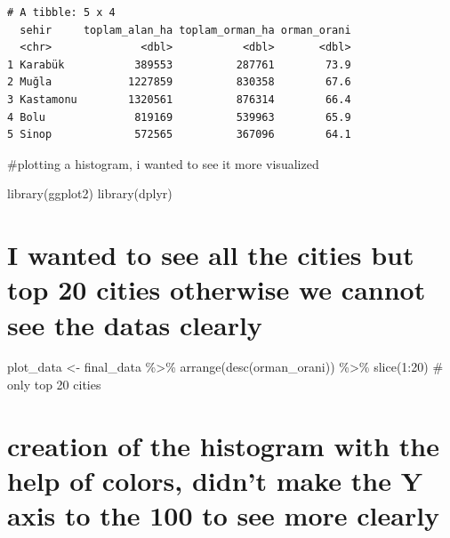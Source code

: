\documentclass[
  11pt,
  a4paper,
  DIV=11,
  numbers=noendperiod]{scrartcl}
\newenvironment{Shaded}{\begin{snugshade}}{\end{snugshade}}
\newcommand{\CommentTok}[1]{\textcolor[rgb]{0.37,0.37,0.37}{#1}}
\newcommand{\DecValTok}[1]{\textcolor[rgb]{0.68,0.00,0.00}{#1}}
\newcommand{\FunctionTok}[1]{\textcolor[rgb]{0.28,0.35,0.67}{#1}}
\newcommand{\NormalTok}[1]{\textcolor[rgb]{0.00,0.23,0.31}{#1}}
\newcommand{\OtherTok}[1]{\textcolor[rgb]{0.00,0.23,0.31}{#1}}
\newcommand{\SpecialCharTok}[1]{\textcolor[rgb]{0.37,0.37,0.37}{#1}}
\begin{document}
\begin{verbatim}
# A tibble: 5 x 4
  sehir     toplam_alan_ha toplam_orman_ha orman_orani
  <chr>              <dbl>           <dbl>       <dbl>
1 Karabük           389553          287761        73.9
2 Muğla            1227859          830358        67.6
3 Kastamonu        1320561          876314        66.4
4 Bolu              819169          539963        65.9
5 Sinop             572565          367096        64.1
\end{verbatim}

\#plotting a histogram, i wanted to see it more visualized

\begin{Shaded}
\begin{Highlighting}[]
\FunctionTok{library}\NormalTok{(ggplot2)}
\FunctionTok{library}\NormalTok{(dplyr)}
\end{Highlighting}
\end{Shaded}

\section{I wanted to see all the cities but top 20 cities otherwise we
cannot see the datas
clearly}\label{i-wanted-to-see-all-the-cities-but-top-20-cities-otherwise-we-cannot-see-the-datas-clearly}

\begin{Shaded}
\begin{Highlighting}[]
\NormalTok{plot\_data }\OtherTok{\textless{}{-}}\NormalTok{ final\_data }\SpecialCharTok{\%\textgreater{}\%}
  \FunctionTok{arrange}\NormalTok{(}\FunctionTok{desc}\NormalTok{(orman\_orani)) }\SpecialCharTok{\%\textgreater{}\%}
  \FunctionTok{slice}\NormalTok{(}\DecValTok{1}\SpecialCharTok{:}\DecValTok{20}\NormalTok{) }\CommentTok{\# only top 20 cities}
\end{Highlighting}
\end{Shaded}

\section{creation of the histogram with the help of colors, didn't make
the Y axis to the 100 to see more
clearly}\label{creation-of-the-histogram-with-the-help-of-colors-didnt-make-the-y-axis-to-the-100-to-see-more-clearly}
\end{document}
